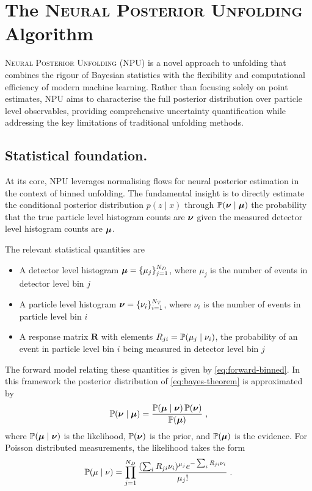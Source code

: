 \section{The \textsc{Neural Posterior Unfolding} Algorithm}
\sectionminitoc
    \textsc{Neural Posterior Unfolding} (NPU) is a novel approach to unfolding that combines the rigour of Bayesian statistics with the flexibility and computational efficiency of modern machine learning.
    Rather than focusing solely on point estimates, NPU aims to characterise the full posterior distribution over particle level observables, providing comprehensive uncertainty quantification while addressing the key limitations of traditional unfolding methods.
\subsection{Statistical foundation.}
    At its core, NPU leverages normalising flows for neural posterior estimation in the context of binned unfolding.
    The fundamental insight is to directly estimate the conditional posterior distribution \(p(z\mid x)\) through \(\P(\vb*\nu\mid \vb*\mu)\) the probability that the true particle level histogram counts are $\vb*\nu$ given the measured detector level histogram counts are $\vb*\mu$.

    The relevant statistical quantities are
        \begin{itemize}
        \item A detector level histogram $\vb*\mu = \{\mu_j\}_{j=1}^{N_D}$, where $\mu_j$ is the number of events in detector level bin $j$
        \item A particle level histogram $\vb*\nu = \{\nu_i\}_{i=1}^{N_T}$, where $\nu_i$ is the number of events in particle level bin $i$
        \item A response matrix $\mathbf{R}$ with elements $R_{ji} = \P(\mu_j\mid \nu_i)$, the probability of an event in particle level bin $i$ being measured in detector level bin $j$
    \end{itemize}
    
    The forward model relating these quantities is given by \cref{eq:forward-binned}.
    In this framework the posterior distribution of \cref{eq:bayes-theorem} is approximated by
    \[
        \P(\vb*\nu\mid\vb*\mu) = \frac{\P(\vb*\mu\mid\vb*\nu)\,\P(\vb*\nu)}{\P(\vb*\mu)}\;,
    \]
    where $\P(\vb*\mu\mid\vb*\nu)$ is the likelihood, $\P(\vb*\nu)$ is the prior, and $\P(\vb*\mu)$ is the evidence.
    For Poisson distributed measurements, the likelihood takes the form
    \[
        \P(\mu\mid\nu) = \prod_{j=1}^{N_D} \frac{(\sum_i R_{ji}\nu_i)^{\mu_j} e^{-\sum_i R_{ji}\nu_i}}{\mu_j!}\;.
    \]
    
